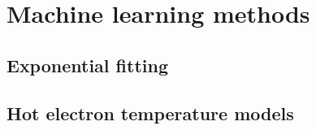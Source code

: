 \chapter{Machine learning methods}
\section{Exponential fitting}
\section{Hot electron temperature models}